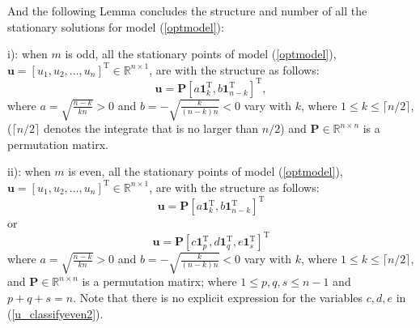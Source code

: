 And the  following  Lemma  concludes
the structure and number  of all  the  stationary  solutions for model (\ref{optmodel}):
\begin{lemma}\label{Theorem_structureofall}
	
	i):
	when  $m$  is  odd, 
	all  the  stationary   points  of    model (\ref{optmodel}), 
	$	\mathbf   u =  
	[u_1,u_2,\dots, u_{n}]^{\mathrm T} \in  \mathbb {R}^{n \times 1}  $, 
	are  with   the  structure as  follows:
		\begin{equation}\label{u_classifyodd}
\mathbf u
=
\mathbf P
[
a \mathbf 1_{k}^{\mathrm T},
b \mathbf 1_{n-k}^{\mathrm T}
]^{\mathrm T}, 
\end{equation}
	where  
	$ a=   \sqrt{	\frac{n-k} {k n}		} >0 $  and  
	$  b=-  \sqrt{	\frac{k} {(n-k) n}	}   <0 $ vary with $k$, 
	where $1 \le  k  \le \lceil n/2  \rceil $, ($\lceil n/2  \rceil$ denotes the 
	integrate that is no larger than $ n/2 $)
	and
	$\mathbf P \in  \mathbb R^{n \times n} $
	is  a 
	permutation matirx. 
	
			ii):
		when  $m$  is  even, 
		all  the  stationary   points  of    model (\ref{optmodel}), 
		$	\mathbf   u =  
		[u_1,u_2,\dots, u_{n}]^{\mathrm T} \in  \mathbb {R}^{n \times 1}  $, 
		are  with   the  structure as  follows:
		\begin{equation}\label{u_classifyeven1}
		\mathbf u
		=
		\mathbf P
		[
		a \mathbf 1_{k}^{\mathrm T},
		b \mathbf 1_{n-k}^{\mathrm T}
		]^{\mathrm T}
		\end{equation}
		or 
		\begin{equation}\label{u_classifyeven2}
		\mathbf u
		=
			\mathbf P
			[
		c \mathbf 1_{p}^{\mathrm T},
		d \mathbf 1_{q}^{\mathrm T},
		e \mathbf 1_{s}^{\mathrm T}
		]^{\mathrm T}
		\end{equation}
			where  
		$ a=   \sqrt{	\frac{n-k} {k n}		} >0 $  and  
		$  b=-  \sqrt{	\frac{k} {(n-k) n}	}   <0 $ vary with $k$, 
			where $1 \le  k  \le \lceil n/2  \rceil$,  
		and
		$\mathbf P \in  \mathbb R^{n \times n}$
		is  a 
		permutation matirx;
			where $1 \le  p,q,s  \le n-1$ and    $p+q+s=n$.
		Note that there is no   explicit expression for the variables  $c,d,e$
		in (\ref{u_classifyeven2}).
		

\end{lemma}
